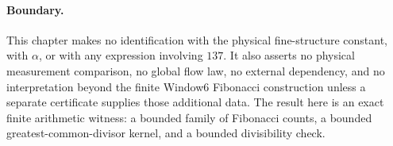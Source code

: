 \paragraph{Boundary.}
This chapter makes no identification with the physical fine-structure constant, with $\alpha$, or with any expression involving $137$. It also asserts no physical measurement comparison, no global flow law, no external dependency, and no interpretation beyond the finite Window6 Fibonacci construction unless a separate certificate supplies those additional data. The result here is an exact finite arithmetic witness: a bounded family of Fibonacci counts, a bounded greatest-common-divisor kernel, and a bounded divisibility check.
